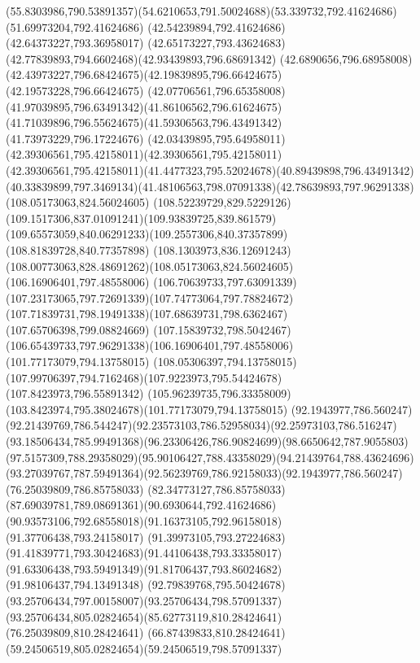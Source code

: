 {{\curveto(55.8303986,790.53891357)(54.6210653,791.50024688)(53.339732,792.41624686)
\lineto(51.69973204,792.41624686)
\lineto(42.54239894,792.41624686)
\lineto(42.64373227,793.36958017)
\curveto(42.65173227,793.43624683)(42.77839893,794.6602468)(42.93439893,796.68691342)
\curveto(42.6890656,796.68958008)(42.43973227,796.68424675)(42.19839895,796.66424675)
\lineto(42.19573228,796.66424675)
\curveto(42.07706561,796.65358008)(41.97039895,796.63491342)(41.86106562,796.61624675)
\curveto(41.71039896,796.55624675)(41.59306563,796.43491342)(41.73973229,796.17224676)
\curveto(42.03439895,795.64958011)(42.39306561,795.42158011)(42.39306561,795.42158011)
\curveto(42.39306561,795.42158011)(41.4477323,795.52024678)(40.89439898,796.43491342)
\curveto(40.33839899,797.3469134)(41.48106563,798.07091338)(42.78639893,797.96291338)
\moveto(108.05173063,824.56024605)
\curveto(108.52239729,829.5229126)(109.1517306,837.01091241)(109.93839725,839.861579)
\curveto(109.65573059,840.06291233)(109.2557306,840.37357899)(108.81839728,840.77357898)
\curveto(108.1303973,836.12691243)(108.00773063,828.48691262)(108.05173063,824.56024605)
\moveto(106.16906401,797.48558006)
\curveto(106.70639733,797.63091339)(107.23173065,797.72691339)(107.74773064,797.78824672)
\curveto(107.71839731,798.19491338)(107.68639731,798.6362467)(107.65706398,799.08824669)
\curveto(107.15839732,798.5042467)(106.65439733,797.96291338)(106.16906401,797.48558006)
\moveto(101.77173079,794.13758015)
\lineto(108.05306397,794.13758015)
\curveto(107.99706397,794.7162468)(107.9223973,795.54424678)(107.8423973,796.55891342)
\curveto(105.96239735,796.33358009)(103.8423974,795.38024678)(101.77173079,794.13758015)
\moveto(92.1943977,786.560247)
\curveto(92.21439769,786.544247)(92.23573103,786.52958034)(92.25973103,786.516247)
\curveto(93.18506434,785.99491368)(96.23306426,786.90824699)(98.6650642,787.9055803)
\curveto(97.5157309,788.29358029)(95.90106427,788.43358029)(94.21439764,788.43624696)
\curveto(93.27039767,787.59491364)(92.56239769,786.92158033)(92.1943977,786.560247)
\moveto(76.25039809,786.85758033)
\curveto(82.34773127,786.85758033)(87.69039781,789.08691361)(90.6930644,792.41624686)
\curveto(90.93573106,792.68558018)(91.16373105,792.96158018)(91.37706438,793.24158017)
\curveto(91.39973105,793.27224683)(91.41839771,793.30424683)(91.44106438,793.33358017)
\curveto(91.63306438,793.59491349)(91.81706437,793.86024682)(91.98106437,794.13491348)
\curveto(92.79839768,795.50424678)(93.25706434,797.00158007)(93.25706434,798.57091337)
\curveto(93.25706434,805.02824654)(85.62773119,810.28424641)(76.25039809,810.28424641)
\curveto(66.87439833,810.28424641)(59.24506519,805.02824654)(59.24506519,798.57091337)
}}
